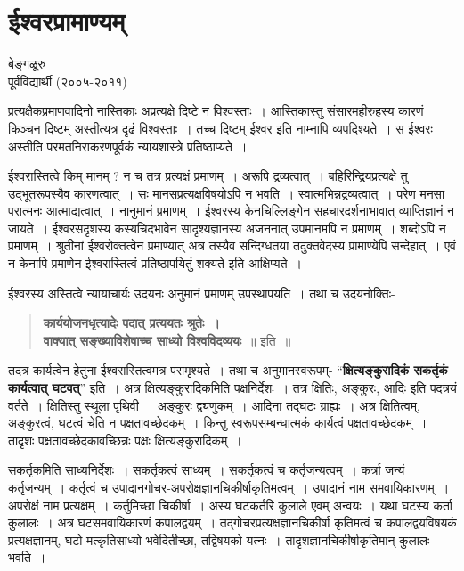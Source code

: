 {\fontsize{15}{17}\selectfont
\chapter{ईश्वरप्रामाण्यम्}

\begin{center}
\smallskip

बेङ्गळूरु\\
पूर्वविद्यार्थी (२००५-२०११)
\addrule
\end{center}
प्रत्यक्षैकप्रमाणवादिनो नास्तिकाः अप्रत्यक्षे दिष्टे न विश्वस्ताः~। आस्तिकास्तु संसारमहीरुहस्य कारणं किञ्चन दिष्टम् अस्तीत्यत्र दृढं विश्वस्ताः~। तच्च दिष्टम् ईश्वर इति नाम्नापि व्यपदिश्यते~। स ईश्वरः अस्तीति परमतनिराकरणपूर्वकं न्यायशास्त्रे प्रतिष्ठाप्यते~। 

ईश्वरास्तित्वे किम् मानम् ? न च तत्र प्रत्यक्षं प्रमाणम्~। अरूपि द्रव्यत्वात्~। बहिरिन्द्रियप्रत्यक्षे तु उद्भूतरूपस्यैव कारणत्वात्~। सः मानसप्रत्यक्षविषयोऽपि न भवति~। स्वात्मभिन्नद्रव्यत्वात्~। परेण मनसा परात्मनः आत्माद्यत्वात्~। नानुमानं प्रमाणम्~। ईश्वरस्य केनचिल्लिङ्गेन सहचारदर्शनाभावात् व्याप्तिज्ञानं न जायते~। ईश्वरसदृशस्य कस्यचिदभावेन सादृश्यज्ञानस्य अजननात् उपमानमपि न प्रमाणम्~। शब्दोऽपि न प्रमाणम्~। श्रुतीनां ईश्वरोक्तत्वेन प्रमाण्यात् अत्र तस्यैव सन्दिग्धतया तदुक्तवेदस्य प्रामाण्येपि सन्देहात्~। एवं न केनापि प्रमाणेन ईश्वरास्तित्वं प्रतिष्ठापयितुं शक्यते इति आक्षिप्यते~। 

ईश्वरस्य अस्तित्वे न्यायाचार्यः उदयनः अनुमानं प्रमाणम् उपस्थापयति~। तथा च उदयनोक्तिः-
\begin{verse}
\textbf{कार्ययोजनधृत्यादेः पदात् प्रत्ययतः श्रुतेः~। \\
वाक्यात् सङ्ख्याविशेषाच्च साध्यो विश्वविदव्ययः}~॥ इति~॥
\end{verse}
तदत्र कार्यत्वेन हेतुना ईश्वरास्तित्वमत्र परामृश्यते~। तथा च अनुमानस्वरूपम्- “\textbf{क्षित्यङ्कुरादिकं सकर्तृकं कार्यत्वात् घटवत्}” इति~। अत्र क्षित्यङ्कुरादिकमिति पक्षनिर्देशः~। तत्र क्षितिः, अङ्कुरः, आदिः इति पदत्रयं वर्तते~। क्षितिस्तु स्थूला पृथिवी~। अङ्कुरः द्व्यणुकम्~। आदिना तद्घटः ग्राह्यः~। अत्र क्षितित्वम्, अङ्कुरत्वं, घटत्वं चेति न पक्षतावच्छेदकम्~। किन्तु स्वरूपसम्बन्धात्मकं कार्यत्वं पक्षतावच्छेदकम्~। तादृशः पक्षतावच्छेदकावच्छिन्नः पक्षः क्षित्यङ्कुरादिकम्~। 

सकर्तृकमिति साध्यनिर्देशः~। सकर्तृकत्वं साध्यम्~। सकर्तृकत्वं च कर्तृजन्यत्वम्~। कर्त्रा जन्यं कर्तृजन्यम्~। कर्तृत्वं च उपादानगोचर-अपरोक्षज्ञानचिकीर्षाकृतिमत्वम्~। उपादानं नाम समवायिकारणम्~। अपरोक्षं नाम प्रत्यक्षम्~। कर्तुमिच्छा चिकीर्षा~। अस्य घटकर्तरि कुलाले एवम् अन्वयः~। यथा घटस्य कर्ता कुलालः~। अत्र घटसमवायिकारणं कपालद्वयम्~। तद्गोचरप्रत्यक्षज्ञानचिकीर्षा कृतिमत्वं च कपालद्वयविषयकं प्रत्यक्षज्ञानम्, घटो मत्कृतिसाध्यो भवेदितीच्छा, तद्विषयको यत्नः~। तादृशज्ञानचिकीर्षाकृतिमान् कुलालः भवति~। 

}
